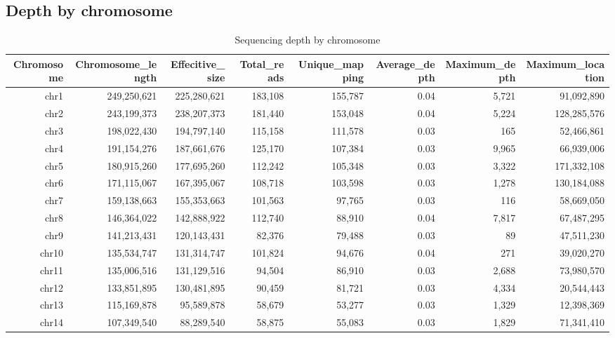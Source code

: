 \documentclass{article}
\begin{document}
\subsection{Depth by chromosome}
\begin{center}
{\tiny
\begin{longtable}{|r|r|r|r|r|r|r|r|}
\caption{Sequencing depth by chromosome} \\ 
  \hline
Chromosome & Chromosome\_length & Effecitive\_size & Total\_reads & Unique\_mapping & Average\_depth & Maximum\_depth & Maximum\_location \\ 
  \hline
chr1 & 249,250,621 & 225,280,621 & 183,108 & 155,787 & 0.04 & 5,721 &  91,092,890 \\ 
   \rowcolor[gray]{0.9}chr2 & 243,199,373 & 238,207,373 & 181,440 & 153,048 & 0.04 & 5,224 & 128,285,576 \\ 
  chr3 & 198,022,430 & 194,797,140 & 115,158 & 111,578 & 0.03 &   165 &  52,466,861 \\ 
   \rowcolor[gray]{0.9}chr4 & 191,154,276 & 187,661,676 & 125,170 & 107,384 & 0.03 & 9,965 &  66,939,006 \\ 
  chr5 & 180,915,260 & 177,695,260 & 112,242 & 105,348 & 0.03 & 3,322 & 171,332,108 \\ 
   \rowcolor[gray]{0.9}chr6 & 171,115,067 & 167,395,067 & 108,718 & 103,598 & 0.03 & 1,278 & 130,184,088 \\ 
  chr7 & 159,138,663 & 155,353,663 & 101,563 &  97,765 & 0.03 &   116 &  58,669,050 \\ 
   \rowcolor[gray]{0.9}chr8 & 146,364,022 & 142,888,922 & 112,740 &  88,910 & 0.04 & 7,817 &  67,487,295 \\ 
  chr9 & 141,213,431 & 120,143,431 &  82,376 &  79,488 & 0.03 &    89 &  47,511,230 \\ 
   \rowcolor[gray]{0.9}chr10 & 135,534,747 & 131,314,747 & 101,824 &  94,676 & 0.04 &   271 &  39,020,270 \\ 
  chr11 & 135,006,516 & 131,129,516 &  94,504 &  86,910 & 0.03 & 2,688 &  73,980,570 \\ 
   \rowcolor[gray]{0.9}chr12 & 133,851,895 & 130,481,895 &  90,459 &  81,721 & 0.03 & 4,334 &  20,544,443 \\ 
  chr13 & 115,169,878 &  95,589,878 &  58,679 &  53,277 & 0.03 & 1,329 &  12,398,369 \\ 
   \rowcolor[gray]{0.9}chr14 & 107,349,540 &  88,289,540 &  58,875 &  55,083 & 0.03 & 1,829 &  71,341,410 \\ 

\end{longtable}}
\end{center}
\end{document}
